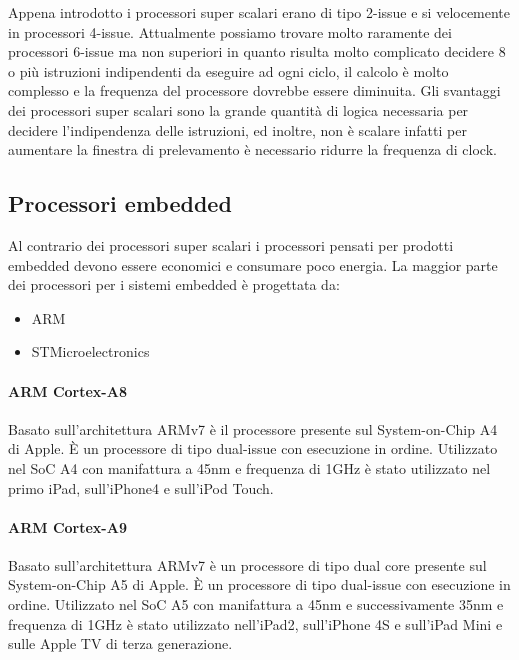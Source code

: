 Appena introdotto i processori super scalari erano di tipo 2-issue e si  velocemente in processori  4-issue. Attualmente possiamo trovare molto raramente dei processori 6-issue ma non superiori in quanto risulta molto complicato decidere 8 o più istruzioni indipendenti da eseguire ad ogni ciclo, il calcolo è molto complesso e la frequenza del processore dovrebbe essere diminuita. Gli svantaggi dei processori super scalari sono la grande quantità di logica necessaria per decidere l'indipendenza delle istruzioni, ed inoltre, non è scalare infatti per aumentare la finestra di prelevamento è necessario ridurre la frequenza di clock.
\subsection{Processori embedded}
Al contrario dei processori super scalari i processori pensati per prodotti embedded devono essere economici e consumare poco energia. La maggior parte dei processori per i sistemi embedded è progettata da:
\begin{itemize}
\item ARM
\item STMicroelectronics
\end{itemize}
\paragraph{ARM Cortex-A8}
Basato sull'architettura ARMv7 è il processore presente sul System-on-Chip A4 di Apple. \uppercase{è} un processore di tipo dual-issue con esecuzione in ordine. Utilizzato nel SoC A4 con manifattura a 45nm e frequenza di 1GHz è stato utilizzato nel primo iPad, sull'iPhone4 e sull'iPod Touch.
\paragraph{ARM Cortex-A9}
Basato sull'architettura ARMv7 è un processore di tipo dual core presente sul System-on-Chip A5 di Apple. \uppercase{è} un processore di tipo dual-issue con esecuzione in ordine. Utilizzato nel SoC A5 con manifattura a 45nm e successivamente 35nm e frequenza di 1GHz è stato utilizzato nell'iPad2, sull'iPhone 4S e sull'iPad Mini e sulle Apple TV di terza generazione.

